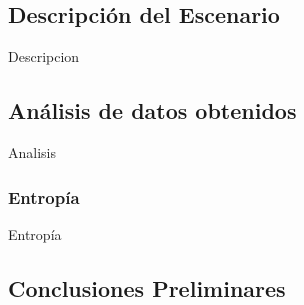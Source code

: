 \subsection{Descripci\'on del Escenario}
	\par Descripcion

\subsection{An\'alisis de datos obtenidos}
	\par Analisis

	\subsubsection{Entrop\'ia}
		\par Entrop\'ia

\subsection{Conclusiones Preliminares}
